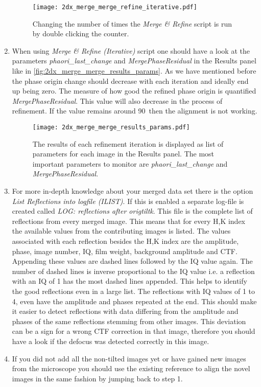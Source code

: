 \begin{enumerate}
	\begin{figure}[H]
		\centering
		\texttt{[image: 2dx\_merge\_merge\_refine\_iterative.pdf]}
		\caption{Changing the number of times the  \textit{Merge \& Refine} script is run by double clicking the counter.}
		\label{fig:2dx_merge_merge_refine_iterative}
	\end{figure}
	\item When using \textit{Merge \& Refine (Iterative)} script one should have a look at the parameters \textit{phaori\_last\_change} and \textit{MergePhaseResidual} in the Results panel like in \autoref{fig:2dx_merge_merge_results_params}. As we have mentioned before the phase origin change should decrease with each iteration and ideally end up being zero. The measure of how good the refined phase origin is quantified \textit{MergePhaseResidual}. This value will also decrease in the process of refinement. If the value remains around 90\textdegree~then the alignment is not working.
		\begin{figure}[H]
		\centering
		\texttt{[image: 2dx\_merge\_merge\_results\_params.pdf]}
		\caption{The results of each refinement iteration is displayed as list of parameters for each image in the Results panel. The most important parameters to monitor are \textit{phaori\_last\_change} and \textit{MergePhaseResidual}.}
		\label{fig:2dx_merge_merge_results_params}
		\end{figure}
	\item For more in-depth knowledge about your merged data set there is the option \textit{List Reflections into logfile (ILIST)}. If this is enabled a separate log-file is created called \textit{LOG: reflections after origtiltk}. This file is the complete list of reflections from every merged image. This means that for every H,K index the available values from the contributing images is listed. The values associated with each reflection besides the H,K index are the amplitude, phase, image number, IQ, film weight, background amplitude and CTF. Appending these values are dashed lines followed by the IQ value again. The number of dashed lines is inverse proportional to the IQ value i.e. a reflection with an IQ of 1 has the most dashed lines appended. This helps to identify the good reflections even in a large list. The reflections with IQ values of 1 to 4, even have the amplitude and phases repeated at the end. This should make it easier to detect reflections with data differing from the amplitude and phases of the same reflections stemming from other images. This deviation can be a sign for a wrong CTF correction in that image, therefore you should have a look if the defocus was detected correctly in this image. 
	\item If you did not add all the non-tilted images yet or have gained new images from the microscope you should use the existing reference to align the novel images in the same fashion by jumping back to step 1.
\end{enumerate}
